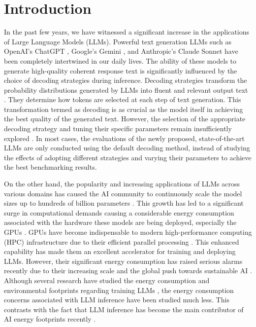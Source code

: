 \section{Introduction}
\label{intro}

In the past few years, we have witnessed a significant increase in the applications of Large Language Models (LLMs). Powerful text generation LLMs such as OpenAI's ChatGPT \cite{chatgpt}, Google’s Gemini \cite{gemini}, and Anthropic’s Claude Sonnet \cite{sonnet} have been completely intertwined in our daily lives. The ability of these models to generate high-quality coherent response text is significantly influenced by the choice of decoding strategies during inference. Decoding strategies transform the probability distributions generated by LLMs into fluent and relevant output text \cite{one,two,three}. They determine how tokens are selected at each step of text generation. This transformation termed as decoding is as crucial as the model itself in achieving the best quality of the generated text. However, the selection of the appropriate decoding strategy and tuning their specific parameters remain insufficiently explored \cite{one}. In most cases, the evaluations of the newly proposed, state-of-the-art LLMs are only conducted using the default decoding method, instead of studying the effects of adopting different strategies and varying their parameters to achieve the best benchmarking results.     

On the other hand, the popularity and increasing applications of LLMs across various domains has caused the AI community to continuously scale the model sizes up to hundreds of billion parameters \cite{palm}. This growth has led to a significant surge in computational demands causing a considerable energy consumption associated with the hardware these models are being deployed, especially the GPUs \cite{nine,ten}. GPUs have become indispensable to modern high-performance computing (HPC) infrastructure due to their efficient parallel processing \cite{sixteen}. This enhanced capability has made them an excellent accelerator for training and deploying LLMs. However, their significant energy consumption has raised serious alarms recently due to their increasing scale and the global push towards sustainable AI \cite{nine,twelve}. Although several research have studied the energy consumption and environmental footprints regarding training LLMs \cite{thirteen,fourteen,fifteen,seventeen}, the energy consumption concerns associated with LLM inference have been studied much less. This contrasts with the fact that LLM inference has become the main contributor of AI energy footprints recently \cite{eleven}. 

